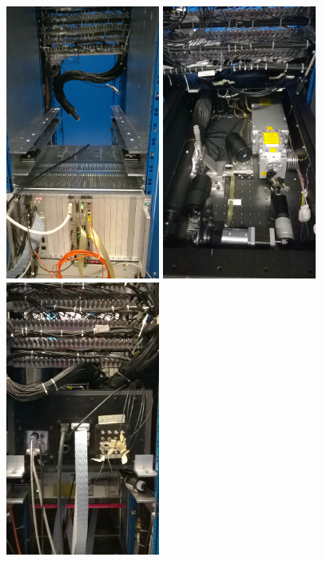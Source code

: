 \begin{figure}[htbp]
\begin{center} 
\includegraphics[width=5.cm, height=9cm]{figures/WP_20141009_15_37_36_Pro}
\includegraphics[width=5.cm, height=9cm]{figures/WP_20141009_16_17_31_Pro}
\includegraphics[width=5.cm, height=9cm]{figures/WP_20141010_12_11_55_Pro}

\end{center}
\end{figure}
